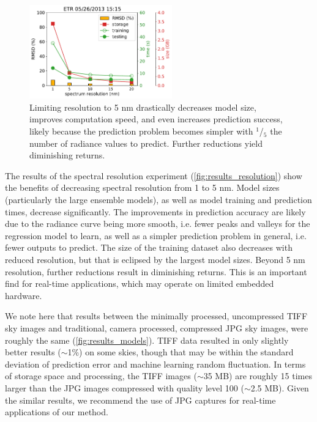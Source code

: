 \begin{figure}[pos=tbp]
\begin{center}
\includegraphics[width=0.55\textwidth]{img/results_resolution.pdf}
\vspace{-2mm}
\caption[resultsresolution]{Limiting resolution to 5 nm drastically decreases model size, improves computation speed, and even increases prediction success, likely because the prediction problem becomes simpler with $^1$/$_5$ the number of radiance values to predict. Further reductions yield diminishing returns.}
\label{fig:results_resolution}
\end{center}
\end{figure}

The results of the spectral resolution experiment (\autoref{fig:results_resolution}) show the benefits of decreasing spectral resolution from 1 to 5 nm. Model sizes (particularly the large ensemble models), as well as model training and prediction times, decrease significantly. The improvements in prediction accuracy are likely due to the radiance curve being more smooth, i.e. fewer peaks and valleys for the regression model to learn, as well as a simpler prediction problem in general, i.e. fewer outputs to predict. The size of the training dataset also decreases with reduced resolution, but that is eclipsed by the largest model sizes. Beyond 5 nm resolution, further reductions result in diminishing returns. This is an important find for real-time applications, which may operate on limited embedded hardware.

We note here that results between the minimally processed, uncompressed TIFF sky images and traditional, camera processed, compressed JPG sky images, were roughly the same (\autoref{fig:results_models}). TIFF data resulted in only slightly better results ($\mathtt{\sim}$1\%) on some skies, though that may be within the standard deviation of prediction error and machine learning random fluctuation. In terms of storage space and processing, the TIFF images ($\mathtt{\sim}$35 MB) are roughly 15 times larger than the JPG images compressed with quality level 100 ($\mathtt{\sim}$2.5 MB). Given the similar results, we recommend the use of JPG captures for real-time applications of our method.

